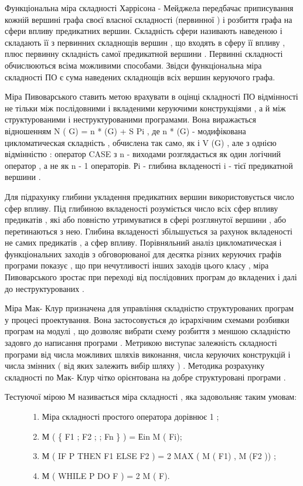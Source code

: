 Функціональна міра складності Харрісона - Мейджела передбачає приписування кожній вершині графа своєї власної складності (первинної ) і розбиття графа на сфери впливу предикатних вершин. Складність сфери називають наведеною і складають її з первинних складнощів вершин , що входять в сферу її впливу , плюс первинну складність самої предикатной вершини . Первинні складності обчислюються всіма можливими способами. Звідси функціональна міра складності ПО є сума наведених складнощів всіх вершин керуючого графа.

Міра Пивоварського ставить метою врахувати в оцінці складності ПО відмінності не тільки між послідовними і вкладеними керуючими конструкціями , а й між структурованими і неструктурованими програмами. Вона виражається відношенням N ( G) = n * (G) + S Pi , де n * (G) - модифікована цикломатическая складність , обчислена так само, як і V (G) , але з однією відмінністю : оператор CASE з n - виходами розглядається як один логічний оператор , а не як n - 1 операторів. Рi - глибина вкладеності i - тієї предикатной вершини .

Для підрахунку глибини укладення предикатних вершин використовується число сфер впливу. Під глибиною вкладеності розуміється число всіх сфер впливу предикатів , які або повністю утримуватися в сфері розглянутої вершини , або перетинаються з нею. Глибина вкладеності збільшується за рахунок вкладеності не самих предикатів , а сфер впливу. Порівняльний аналіз цикломатическая і функціональних заходів з обговорюваної для десятка різних керуючих графів програми показує , що при нечутливості інших заходів цього класу , міра Пивоварського зростає при переході від послідовних програм до вкладених і далі до неструктурованих .

Міра Мак- Клур призначена для управління складністю структурованих програм у процесі проектування. Вона застосовується до ієрархічним схемами розбивки програм на модулі , що дозволяє вибрати схему розбиття з меншою складністю задовго до написання програми . Метрикою виступає залежність складності програми від числа можливих шляхів виконання, числа керуючих конструкцій і числа змінних ( від яких залежить вибір шляху ) . Методика розрахунку складності по Мак- Клур чітко орієнтована на добре структуровані програми .
\begin{description}
\item[{Тестуючої мірою М називається міра складності , яка задовольняє таким умовам:}] \leavevmode\begin{enumerate}
\item {} 
Міра складності простого оператора дорівнює 1 ;

\item {} 
М ( \{ F1 ; F2 ;  ; Fn \} ) = Еin M ( Fi);

\item {} 
М ( IF P THEN F1 ELSE F2 ) = 2 MAX ( M ( F1) , M (F2 )) ;

\item {} 
М ( WHILE P DO F ) = 2 M ( F).

\end{enumerate}

\end{description}

